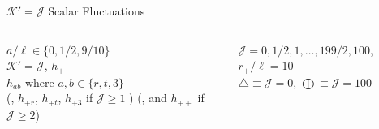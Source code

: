 \documentclass[aspectratio=169, xcolor=dvipsnames]{beamer}
\begin{document}
\begin{frame}{\(\mathcal K' = \mathcal J\) Scalar Fluctuations}
  \vfill

  \begin{columns}[c]
    \begin{column}{0.5\textwidth}
      \(a/\ell \in \{0, 1/2, 9/10\}\)\\
      \(\mathcal K' = \mathcal J\), 
      \(h_{+-}\) \\ \(h_{ab}\) where
      \(a,b \in \{r,t,3\}\)\\
      (, \(h_{+r}\), \(h_{+t}\), \(h_{+3}\) if \(\mathcal J \geq 1\) ) (, and
      \(h_{++}\) if \(\mathcal J \geq 2\))
    \end{column}

    \begin{column}{0.5\textwidth}
      \(\mathcal J = 0, 1/2, 1, \ldots, 199/2, 100\), \(r_+/\ell = 10\)\\
      \(\bigtriangleup \equiv \mathcal J = 0\),
      \(\bigoplus \equiv \mathcal J = 100\)
    \end{column}
  \end{columns}
\end{frame}
\end{document}
